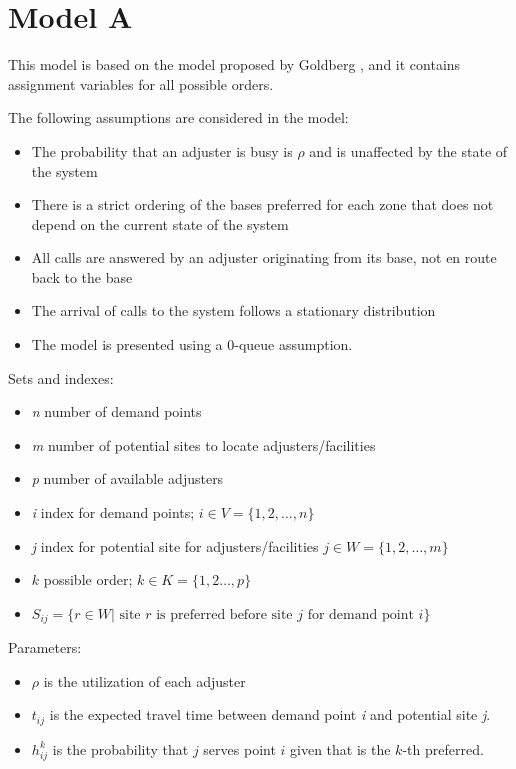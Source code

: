 
\section{Model A}

This model is based
on the model
proposed by Goldberg \cite{goldberg1990validating},
and it contains assignment variables
for all possible orders.

The following assumptions are considered in the model:
\begin{itemize}
\item The probability that an adjuster is busy
  is $\rho$ and is unaffected by the state of the system
\item There is a strict ordering of the bases preferred for each zone
  that does not depend
  on the current state of the system
\item All calls are answered
  by an adjuster originating from its base,
  not en route back to the base
\item The arrival of calls to the system
  follows a stationary distribution
\item The model is presented
  using a 0-queue assumption.
\end{itemize}

Sets and indexes:
\begin{itemize}
\item \textit{n} number of demand points
\item \textit{m} number of potential sites to locate adjusters/facilities
\item \textit{p} number of available adjusters
\item \textit{i} index for demand points;
  $i \in V = \{1,2,\ldots,n\}$ 
\item \textit{j} index for potential site for adjusters/facilities
  $j \in W = \{1,2,\ldots,m\}$
\item $k$ possible order;
  $k \in K = \{1,2\ldots,p\}$
\item $S_{ij} = \{
  r \in W | \mbox{ site } r \mbox{ is preferred before site } j
  \mbox{ for demand point } i
  \}$
\end{itemize}

Parameters:
\begin{itemize}
\item $\rho$ is the utilization of each adjuster
\item $t_{ij}$ is the expected travel time
  between demand point \textit{i}
  and potential site \textit{j}.
\item $h_{ij}^{k}$ is the probability
  that $j$ serves point $i$
  given that
  is the $k$-th preferred.
\end{itemize}

